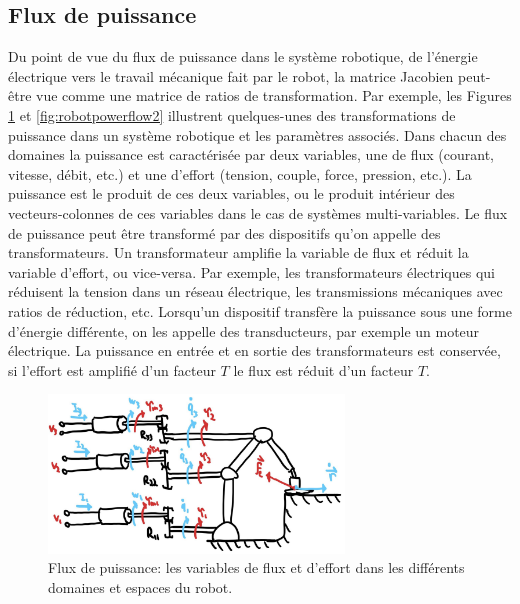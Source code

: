 \subsection{Flux de puissance}

Du point de vue du flux de puissance dans le système robotique, de l'énergie électrique vers le travail mécanique fait par le robot, la matrice Jacobien peut-être vue comme une matrice de ratios de transformation. Par exemple, les Figures \ref{fig:robotpowerflow1} et \ref{fig:robotpowerflow2} illustrent quelques-unes des transformations de puissance dans un système robotique et les paramètres associés. Dans chacun des domaines la puissance est caractérisée par deux variables, une de flux (courant, vitesse, débit, etc.) et une d'effort (tension, couple, force, pression, etc.). La puissance est le produit de ces deux variables, ou le produit intérieur des vecteurs-colonnes de ces variables dans le cas de systèmes multi-variables. Le flux de puissance peut être transformé par des dispositifs qu'on appelle des transformateurs. Un transformateur amplifie la variable de flux et réduit la variable d'effort, ou vice-versa. Par exemple, les transformateurs électriques qui réduisent la tension dans un réseau électrique, les transmissions mécaniques avec ratios de réduction, etc. Lorsqu'un dispositif transfère la puissance sous une forme d'énergie différente, on les appelle des transducteurs, par exemple un moteur électrique. La puissance en entrée et en sortie des transformateurs est conservée, si l'effort est amplifié d'un facteur $T$ le flux est réduit d'un facteur $T$.

\begin{figure}[htpb]
	\centering
	\includegraphics[width=0.70\textwidth]{fig/robotpowerflow1.jpg}
	\caption{Flux de puissance: les variables de flux et d'effort dans les différents domaines et espaces du robot.}
	\label{fig:robotpowerflow1}
\end{figure}

